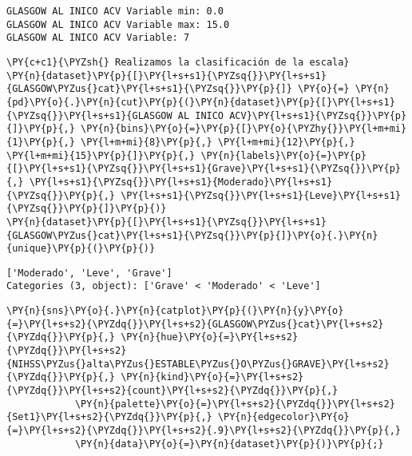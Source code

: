     \begin{Verbatim}[commandchars=\\\{\}]
GLASGOW AL INICO ACV Variable min: 0.0
GLASGOW AL INICO ACV Variable max: 15.0
GLASGOW AL INICO ACV Variable: 7
    \end{Verbatim}

    \begin{tcolorbox}[breakable, size=fbox, boxrule=1pt, pad at break*=1mm,colback=cellbackground, colframe=cellborder]
\begin{Verbatim}[commandchars=\\\{\}]
\PY{c+c1}{\PYZsh{} Realizamos la clasificación de la escala}
\PY{n}{dataset}\PY{p}{[}\PY{l+s+s1}{\PYZsq{}}\PY{l+s+s1}{GLASGOW\PYZus{}cat}\PY{l+s+s1}{\PYZsq{}}\PY{p}{]} \PY{o}{=} \PY{n}{pd}\PY{o}{.}\PY{n}{cut}\PY{p}{(}\PY{n}{dataset}\PY{p}{[}\PY{l+s+s1}{\PYZsq{}}\PY{l+s+s1}{GLASGOW AL INICO ACV}\PY{l+s+s1}{\PYZsq{}}\PY{p}{]}\PY{p}{,} \PY{n}{bins}\PY{o}{=}\PY{p}{[}\PY{o}{\PYZhy{}}\PY{l+m+mi}{1}\PY{p}{,} \PY{l+m+mi}{8}\PY{p}{,} \PY{l+m+mi}{12}\PY{p}{,} \PY{l+m+mi}{15}\PY{p}{]}\PY{p}{,} \PY{n}{labels}\PY{o}{=}\PY{p}{[}\PY{l+s+s1}{\PYZsq{}}\PY{l+s+s1}{Grave}\PY{l+s+s1}{\PYZsq{}}\PY{p}{,} \PY{l+s+s1}{\PYZsq{}}\PY{l+s+s1}{Moderado}\PY{l+s+s1}{\PYZsq{}}\PY{p}{,} \PY{l+s+s1}{\PYZsq{}}\PY{l+s+s1}{Leve}\PY{l+s+s1}{\PYZsq{}}\PY{p}{]}\PY{p}{)}
\PY{n}{dataset}\PY{p}{[}\PY{l+s+s1}{\PYZsq{}}\PY{l+s+s1}{GLASGOW\PYZus{}cat}\PY{l+s+s1}{\PYZsq{}}\PY{p}{]}\PY{o}{.}\PY{n}{unique}\PY{p}{(}\PY{p}{)}
\end{Verbatim}
\end{tcolorbox}

            \begin{tcolorbox}[breakable, size=fbox, boxrule=.5pt, pad at break*=1mm, opacityfill=0]
\begin{Verbatim}[commandchars=\\\{\}]
['Moderado', 'Leve', 'Grave']
Categories (3, object): ['Grave' < 'Moderado' < 'Leve']
\end{Verbatim}
\end{tcolorbox}
        
    \begin{tcolorbox}[breakable, size=fbox, boxrule=1pt, pad at break*=1mm,colback=cellbackground, colframe=cellborder]
\begin{Verbatim}[commandchars=\\\{\}]
\PY{n}{sns}\PY{o}{.}\PY{n}{catplot}\PY{p}{(}\PY{n}{y}\PY{o}{=}\PY{l+s+s2}{\PYZdq{}}\PY{l+s+s2}{GLASGOW\PYZus{}cat}\PY{l+s+s2}{\PYZdq{}}\PY{p}{,} \PY{n}{hue}\PY{o}{=}\PY{l+s+s2}{\PYZdq{}}\PY{l+s+s2}{NIHSS\PYZus{}alta\PYZus{}ESTABLE\PYZus{}O\PYZus{}GRAVE}\PY{l+s+s2}{\PYZdq{}}\PY{p}{,} \PY{n}{kind}\PY{o}{=}\PY{l+s+s2}{\PYZdq{}}\PY{l+s+s2}{count}\PY{l+s+s2}{\PYZdq{}}\PY{p}{,}
            \PY{n}{palette}\PY{o}{=}\PY{l+s+s2}{\PYZdq{}}\PY{l+s+s2}{Set1}\PY{l+s+s2}{\PYZdq{}}\PY{p}{,} \PY{n}{edgecolor}\PY{o}{=}\PY{l+s+s2}{\PYZdq{}}\PY{l+s+s2}{.9}\PY{l+s+s2}{\PYZdq{}}\PY{p}{,}
            \PY{n}{data}\PY{o}{=}\PY{n}{dataset}\PY{p}{)}\PY{p}{;}
\end{Verbatim}
\end{tcolorbox}

